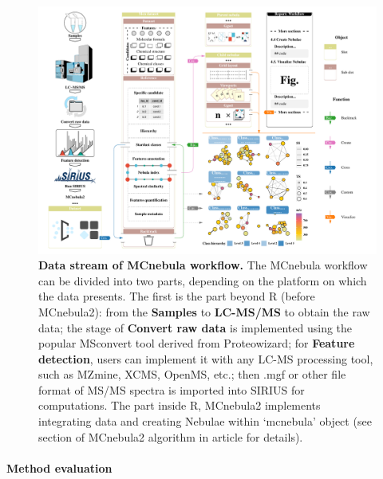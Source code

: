 \documentclass[
]{article}
\begin{document}
\begin{figure}
\hypertarget{fig:data_stream}{%
\centering
\includegraphics{fig2.data_stream.pdf}
\caption{\textbf{Data stream of MCnebula workflow.} The MCnebula
workflow can be divided into two parts, depending on the platform on
which the data presents. The first is the part beyond R (before
MCnebula2): from the \textbf{Samples} to \textbf{LC-MS/MS} to obtain the
raw data; the stage of \textbf{Convert raw data} is implemented using
the popular MSconvert tool derived from Proteowizard; for
\textbf{Feature detection}, users can implement it with any LC-MS
processing tool, such as MZmine, XCMS, OpenMS, etc.; then .mgf or other
file format of MS/MS spectra is imported into SIRIUS for computations.
The part inside R, MCnebula2 implements integrating data and creating
Nebulae within `mcnebula' object (see section of MCnebula2 algorithm in
article for details).}\label{fig:data_stream}
}
\end{figure}

\hypertarget{method-evaluation}{%
\paragraph{Method evaluation}\label{method-evaluation}}
\end{document}
